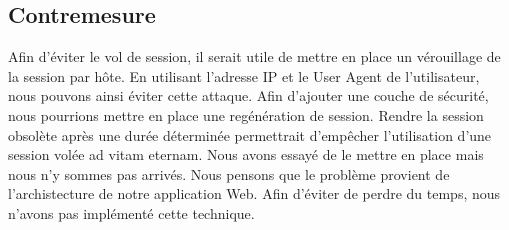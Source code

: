 \documentclass[12pt]{article}
\begin{document}
\subsection{Contremesure}\label{c8}

Afin d'éviter le vol de session, il serait utile de mettre en place un vérouillage de la session par hôte. En utilisant l'adresse IP et le User Agent de l'utilisateur, nous pouvons ainsi éviter cette attaque. Afin d'ajouter une couche de sécurité, nous pourrions mettre en place une regénération de session. Rendre la session obsolète après une durée déterminée permettrait d'empêcher l'utilisation d'une session volée ad vitam eternam.
Nous avons essayé de le mettre en place mais nous n'y sommes pas arrivés. Nous pensons que le problème provient de l'archistecture de notre application Web. Afin d'éviter de perdre du temps, nous n'avons pas implémenté cette technique.
\end{document}
